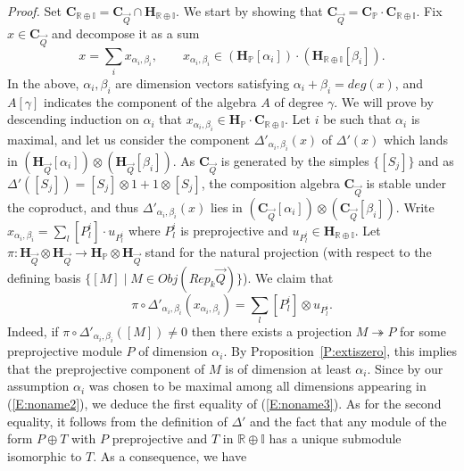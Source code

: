 \documentclass[a4paper,10pt]{amsart}
\def\H{\mathbf{H}}
\def\a{\alpha}
\numberwithin{equation}{section}
\begin{document}
\noindent
\textit{Proof.} Set $\mathbf{C}_{\mathbb{R}\oplus \mathbb{I}}=\mathbf{C}_{\vec{Q}} \cap \H_{\mathbb{R}\oplus \mathbb{I}}$. We start by showing that $\mathbf{C}_{\vec{Q}}=\mathbf{C}_{\mathbb{P}}\cdot \mathbf{C}_{\mathbb{R} \oplus \mathbb{I}}$.
Fix $x \in \mathbf{C}_{\vec{Q}}$ and decompose it as a sum
\begin{equation}\label{E:noname2}
x=\sum_i x_{\a_i,\beta_i}, \qquad x_{\a_i,\beta_i} \in (\H_{\mathbb{P}}[\a_i]) \cdot (\H_{\mathbb{R} \oplus \mathbb{I}}[\beta_i]).
\end{equation}
In the above, $\a_i,\beta_i$ are dimension vectors satisfying $\a_i + \beta_i=deg(x)$, and $A[\gamma]$ indicates the component of the algebra $A$ of degree $\gamma$. We will prove by descending induction on $\a_i$ that $x_{\a_i,\beta_i} \in \H_{\mathbb{P}} \cdot \mathbf{C}_{\mathbb{R}\oplus \mathbb{I}}$. Let $i$ be such that $\a_i$ is maximal, and let us consider the component $\Delta'_{\a_i,\beta_i}(x)$ of $\Delta'(x)$ which lands in $(\H_{\vec{Q}}[\a_i]) \otimes (\H_{\vec{Q}}[\beta_i])$. As $\mathbf{C}_{\vec{Q}}$ is generated by the simples $\{[S_j]\}$ and as
$\Delta'([S_j])=[S_j] \otimes 1 + 1 \otimes [S_j]$, the composition algebra $\mathbf{C}_{\vec{Q}}$ is stable under the coproduct, and thus $\Delta'_{\a_i,\beta_i}(x)$ lies in $(\mathbf{C}_{\vec{Q}}[\a_i]) \otimes (\mathbf{C}_{\vec{Q}}[\beta_i])$. Write $x_{\a_i,\beta_i}=\sum_l [P_l^i] \cdot u_{P_l^i}$ where $P_l^i$ is preprojective and $u_{P_l^i} \in \H_{\mathbb{R}\oplus \mathbb{I}}$. Let $\pi: \H_{\vec{Q}} \otimes \H_{\vec{Q}} \to \H_{\mathbb{P}} \otimes \H_{\vec{Q}}$ stand for the natural projection (with respect to the defining basis $\{[M]\;|\;M \in Obj(Rep_k\vec{Q})\}$).
We claim that
\begin{equation}\label{E:noname3}
\pi\circ\Delta'_{\a_i,\beta_i}(x_{\a_i,\beta_i})= \sum_l  [P_l^i] \otimes u_{P_l^i}.
\end{equation}
Indeed, if $\pi\circ\Delta'_{\a_i,\beta_i}([M]) \neq 0$ then there exists a projection $M \twoheadrightarrow P$ for some preprojective module $P$ of dimension $\a_i$. By Proposition~\ref{P:extiszero}, this implies that the preprojective component of $M$ is of dimension at least $\a_i$. Since by our assumption $\a_i$ was chosen to be maximal among all dimensions appearing in (\ref{E:noname2}), we deduce the first equality of (\ref{E:noname3}). As for the second equality, it follows from the definition of $\Delta'$ and the fact that any module of the form $P\oplus T$ with $P$ preprojective and $T$ in $\mathbb{R} \oplus \mathbb{I}$ has a unique submodule isomorphic to $T$. As a consequence, we have
\end{document}
